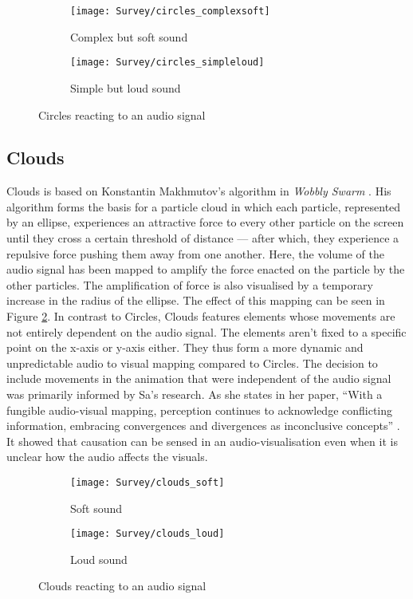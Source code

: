 \documentclass[../initial_thesis.tex]{subfiles}
\begin{document}
\begin{figure}
  \begin{subfigure}{0.5\textwidth}
    \texttt{[image: Survey/circles\_complexsoft]}
    \caption{Complex but soft sound}
  \end{subfigure} 
  \begin{subfigure}{0.5\textwidth}
    \texttt{[image: Survey/circles\_simpleloud]}
    \caption{Simple but loud sound}
  \end{subfigure}
  \caption{Circles reacting to an audio signal}
  \label{fig:circles1}
\end{figure}

\subsection{Clouds}
Clouds is based on Konstantin Makhmutov's algorithm in \textit{Wobbly Swarm} \cite{Makhmutov}. His algorithm forms the basis for a particle cloud in which each particle, represented by an ellipse, experiences an attractive force to every other particle on the screen until they cross a certain threshold of distance --- after which, they experience a repulsive force pushing them away from one another. Here, the volume of the audio signal has been mapped to amplify the force enacted on the particle by the other particles. The amplification of force is also visualised by a temporary increase in the radius of the ellipse. The effect of this mapping can be seen in Figure \ref{fig:clouds1}. In contrast to Circles, Clouds features elements whose movements are not entirely dependent on the audio signal. The elements aren't fixed to a specific point on the x-axis or y-axis either. They thus form a more dynamic and unpredictable audio to visual mapping compared to Circles. The decision to include movements in the animation that were independent of the audio signal was primarily informed by Sa's research. As she states in her paper, ``With a fungible audio-visual mapping, perception continues to acknowledge conflicting information, embracing convergences and divergences as inconclusive concepts'' \cite{Sa2014}. It showed that causation can be sensed in an audio-visualisation even when it is unclear how the audio affects the visuals. 

\begin{figure}
  \begin{subfigure}{0.5\textwidth}
    \texttt{[image: Survey/clouds\_soft]}
    \caption{Soft sound}
  \end{subfigure} 
  \begin{subfigure}{0.5\textwidth}
    \texttt{[image: Survey/clouds\_loud]}
    \caption{Loud sound}
  \end{subfigure}
  \caption{Clouds reacting to an audio signal}
  \label{fig:clouds1}
\end{figure}
\end{document}
